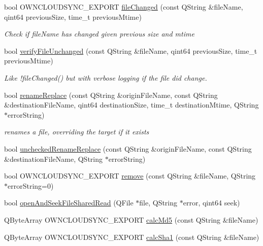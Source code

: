 \begin{DoxyCompactItemize}
bool O\+W\+N\+C\+L\+O\+U\+D\+S\+Y\+N\+C\+\_\+\+E\+X\+P\+O\+RT \hyperlink{namespace_o_c_c_1_1_file_system_aadc87cf3e494c9a930ecf856cc4f77d3}{file\+Changed} (const Q\+String \&file\+Name, qint64 previous\+Size, time\+\_\+t previous\+Mtime)
\begin{DoxyCompactList}\small\item\em Check if {\itshape file\+Name} has changed given previous size and mtime \end{DoxyCompactList}\item 
bool \hyperlink{namespace_o_c_c_1_1_file_system_a9301722279d55a31f6e6df8a534b06ec}{verify\+File\+Unchanged} (const Q\+String \&file\+Name, qint64 previous\+Size, time\+\_\+t previous\+Mtime)
\begin{DoxyCompactList}\small\item\em Like !file\+Changed() but with verbose logging if the file {\itshape did} change. \end{DoxyCompactList}\item 
bool \hyperlink{namespace_o_c_c_1_1_file_system_a54dd5dc2b7a3c50220a3e2a38697bd6f}{rename\+Replace} (const Q\+String \&origin\+File\+Name, const Q\+String \&destination\+File\+Name, qint64 destination\+Size, time\+\_\+t destination\+Mtime, Q\+String $\ast$error\+String)
\begin{DoxyCompactList}\small\item\em renames a file, overriding the target if it exists \end{DoxyCompactList}\item 
bool \hyperlink{namespace_o_c_c_1_1_file_system_ad04aec9abd9b4602dc0bddba125c320c}{unchecked\+Rename\+Replace} (const Q\+String \&origin\+File\+Name, const Q\+String \&destination\+File\+Name, Q\+String $\ast$error\+String)
\item 
bool O\+W\+N\+C\+L\+O\+U\+D\+S\+Y\+N\+C\+\_\+\+E\+X\+P\+O\+RT \hyperlink{namespace_o_c_c_1_1_file_system_a9b2aefeca6606b462584cab952edcbc1}{remove} (const Q\+String \&file\+Name, Q\+String $\ast$error\+String=0)
\item 
bool \hyperlink{namespace_o_c_c_1_1_file_system_a74cbbe123be7666a93799a28d8eb7546}{open\+And\+Seek\+File\+Shared\+Read} (Q\+File $\ast$file, Q\+String $\ast$error, qint64 seek)
\item 
Q\+Byte\+Array O\+W\+N\+C\+L\+O\+U\+D\+S\+Y\+N\+C\+\_\+\+E\+X\+P\+O\+RT \hyperlink{namespace_o_c_c_1_1_file_system_a055cc8e503b643fbc00a678461b6c61b}{calc\+Md5} (const Q\+String \&file\+Name)
\item 
Q\+Byte\+Array O\+W\+N\+C\+L\+O\+U\+D\+S\+Y\+N\+C\+\_\+\+E\+X\+P\+O\+RT \hyperlink{namespace_o_c_c_1_1_file_system_a375c2432148acc82cde481782216558d}{calc\+Sha1} (const Q\+String \&file\+Name)

\end{DoxyCompactItemize}
